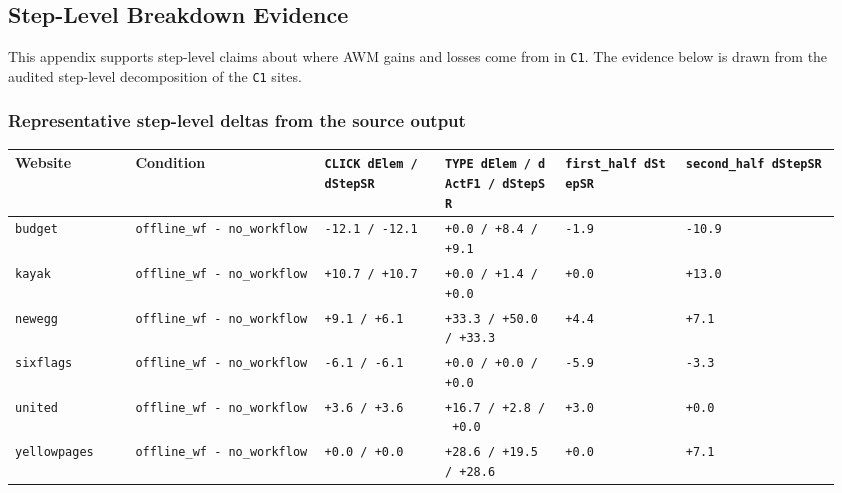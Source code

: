\subsection{Step-Level Breakdown Evidence}\label{app:A1}

This appendix supports step-level claims about where AWM gains and
losses come from in \texttt{C1}. The evidence below is drawn from the
audited step-level decomposition of the \texttt{C1} sites.

\subsubsection{Representative step-level deltas from the source
output}

{\def\LTcaptype{} %
\begin{longtable}[]{@{}>{\raggedright\arraybackslash}p{0.14\linewidth}>{\raggedright\arraybackslash}p{0.22\linewidth}>{\raggedleft\arraybackslash}p{0.14\linewidth}>{\raggedleft\arraybackslash}p{0.14\linewidth}>{\raggedleft\arraybackslash}p{0.14\linewidth}>{\raggedleft\arraybackslash}p{0.18\linewidth}@{}}
\toprule\noalign{}
Website & Condition & \texttt{CLICK\ dElem\ /\ dStepSR} &
\texttt{TYPE\ dElem\ /\ dActF1\ /\ dStepSR} &
\texttt{first\_half\ dStepSR} & \texttt{second\_half\ dStepSR} \\
\midrule\noalign{}
\endhead
\bottomrule\noalign{}
\endlastfoot
\texttt{budget} & \texttt{offline\_wf\ -\ no\_workflow} &
\texttt{-12.1\ /\ -12.1} & \texttt{+0.0\ /\ +8.4\ /\ +9.1} &
\texttt{-1.9} & \texttt{-10.9} \\
\texttt{kayak} & \texttt{offline\_wf\ -\ no\_workflow} &
\texttt{+10.7\ /\ +10.7} & \texttt{+0.0\ /\ +1.4\ /\ +0.0} &
\texttt{+0.0} & \texttt{+13.0} \\
\texttt{newegg} & \texttt{offline\_wf\ -\ no\_workflow} &
\texttt{+9.1\ /\ +6.1} & \texttt{+33.3\ /\ +50.0\ /\ +33.3} &
\texttt{+4.4} & \texttt{+7.1} \\
\texttt{sixflags} & \texttt{offline\_wf\ -\ no\_workflow} &
\texttt{-6.1\ /\ -6.1} & \texttt{+0.0\ /\ +0.0\ /\ +0.0} & \texttt{-5.9}
& \texttt{-3.3} \\
\texttt{united} & \texttt{offline\_wf\ -\ no\_workflow} &
\texttt{+3.6\ /\ +3.6} & \texttt{+16.7\ /\ +2.8\ /\ +0.0} &
\texttt{+3.0} & \texttt{+0.0} \\
\texttt{yellowpages} & \texttt{offline\_wf\ -\ no\_workflow} &
\texttt{+0.0\ /\ +0.0} & \texttt{+28.6\ /\ +19.5\ /\ +28.6} &
\texttt{+0.0} & \texttt{+7.1} \\
\end{longtable}
}

